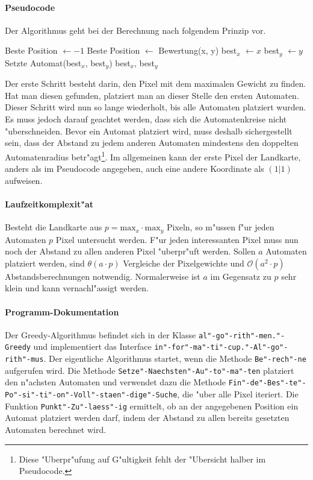 \paragraph{Pseudocode}
Der Algorithmus geht bei der Berechnung nach folgendem Prinzip vor.

\begin{algorithmic}
	\STATE Beste Position $\gets -1$
				\STATE Beste Position $\gets$ Bewertung(x, y)
				\STATE best$_x$ $\gets x$
				\STATE best$_y$ $\gets y$
			\ENDIF
		\ENDFOR
	\ENDFOR
	\STATE Setzte Automat(best$_x$, best$_y$)
\ENDFOR
\RETURN best$_x$, best$_y$
\end{algorithmic}
Der erste Schritt besteht darin, den Pixel mit dem maximalen Gewicht zu finden. Hat man diesen gefunden, platziert man an dieser Stelle den ersten Automaten. Dieser Schritt wird nun so lange wiederholt, bis alle Automaten platziert wurden. Es muss jedoch darauf geachtet werden, dass sich die Automatenkreise nicht "uberschneiden. Bevor ein Automat platziert wird, muss deshalb sichergestellt sein, dass der Abstand zu jedem anderen Automaten mindestens den doppelten Automatenradius betr"agt\footnote{Diese "Uberpr"ufung auf G"ultigkeit fehlt der "Ubersicht halber im Pseudocode.}. Im allgemeinen kann der erste Pixel der Landkarte, anders als im Pseudocode angegeben, auch eine andere Koordinate als \((1|1)\) aufweisen. 

\paragraph{Laufzeitkomplexit"at}
Besteht die Landkarte aus \(p = \mbox{max}_x \cdot \mbox{max}_y\) Pixeln, so m"ussen f"ur jeden Automaten \(p\) Pixel untersucht werden. F"ur jeden interessanten Pixel muss nun noch der Abstand zu allen anderen Pixel "uberpr"uft werden. Sollen \(a\) Automaten platziert werden, sind \(\theta(a \cdot p)\) Vergleiche der Pixelgewichte und \(\mathcal{O}(a^2 \cdot p)\) Abstandsberechnungen notwendig. Normalerweise ist \(a\) im Gegensatz zu \(p\) sehr klein und kann vernachl"assigt werden.

\paragraph{Programm-Dokumentation}
Der Greedy-Algorithmus befindet sich in der Klasse \texttt{al"-go"-rith"-men."-Greedy} und implementiert das Interface \texttt{in"-for"-ma"-ti"-cup."-Al"-go"-rith"-mus}. Der eigentliche Algorithmus startet, wenn die Methode \texttt{Be"-rech"-ne} aufgerufen wird. Die Methode \texttt{Setze"-Naechsten"-Au"-to"-ma"-ten} platziert den n"achsten Automaten und verwendet dazu die Methode \texttt{Fin"-de"-Bes"-te"-Po"-si"-ti"-on"-Voll"-staen"-dige"-Suche}, die "uber alle Pixel iteriert. Die Funktion \texttt{Punkt"-Zu"-laess"-ig} ermittelt, ob an der angegebenen Position ein Automat platziert werden darf, indem der Abstand zu allen bereits gesetzten Automaten berechnet wird.

